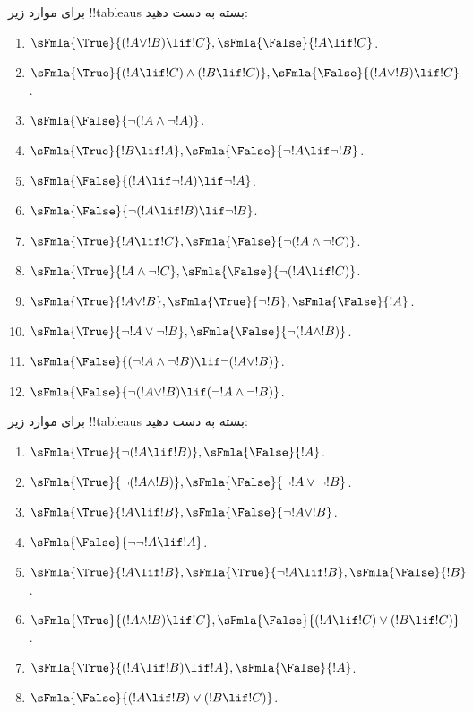 \documentclass[../../../include/open-logic-section]{subfiles}
\begin{document}
\begin{prob}
برای موارد زیر !!{tableau}s بسته به دست دهید:
\begin{enumerate}
\item $\sFmla{\True}{(!A \lor !B) \lif !C}, \sFmla{\False}{!A \lif !C}$.
\item $\sFmla{\True}{(!A \lif !C) \land (!B \lif !C)}, \sFmla{\False}{(!A \lor !B) \lif !C}$.
\item $\sFmla{\False}{\lnot(!A \land \lnot !A)}$.
\item $\sFmla{\True}{!B \lif !A}, \sFmla{\False}{\lnot !A \lif \lnot !B}$.
\item $\sFmla{\False}{(!A \lif \lnot !A) \lif \lnot !A}$.
\item $\sFmla{\False}{\lnot(!A \lif !B) \lif \lnot !B}$.
\item $\sFmla{\True}{!A \lif !C}, \sFmla{\False}{\lnot (!A \land \lnot !C)}$.
\item $\sFmla{\True}{!A \land \lnot !C}, \sFmla{\False}{\lnot (!A \lif !C)}$.
\item $\sFmla{\True}{!A \lor !B}, \sFmla{\True}{\lnot !B}, \sFmla{\False}{!A}$.
\item $\sFmla{\True}{\lnot !A \lor \lnot !B}, \sFmla{\False}{\lnot(!A \land !B)}$.
\item $\sFmla{\False}{(\lnot !A \land \lnot !B) \lif\lnot(!A \lor !B)}$.
\item $\sFmla{\False}{\lnot(!A \lor !B) \lif (\lnot !A \land \lnot !B)}$.
\end{enumerate}
\end{prob}

\begin{prob}
برای موارد زیر !!{tableau}s بسته به دست دهید:
\begin{enumerate}
\item $\sFmla{\True}{\lnot(!A \lif !B)}, \sFmla{\False}{!A}$.
\item $\sFmla{\True}{\lnot(!A \land !B)}, \sFmla{\False}{\lnot !A \lor \lnot !B}$.
\item $\sFmla{\True}{!A \lif !B}, \sFmla{\False}{\lnot !A \lor !B}$.
\item $\sFmla{\False}{\lnot \lnot !A \lif !A}$.
\item $\sFmla{\True}{!A \lif !B}, \sFmla{\True}{\lnot !A \lif !B}, \sFmla{\False}{!B}$.
\item $\sFmla{\True}{(!A \land !B) \lif !C}, \sFmla{\False}{(!A \lif !C) \lor (!B \lif !C)}$.
\item $\sFmla{\True}{(!A \lif !B) \lif !A}, \sFmla{\False}{!A}$.
\item $\sFmla{\False}{(!A \lif !B) \lor (!B \lif !C)}$.
\end{enumerate}
\end{prob}
\end{document}
